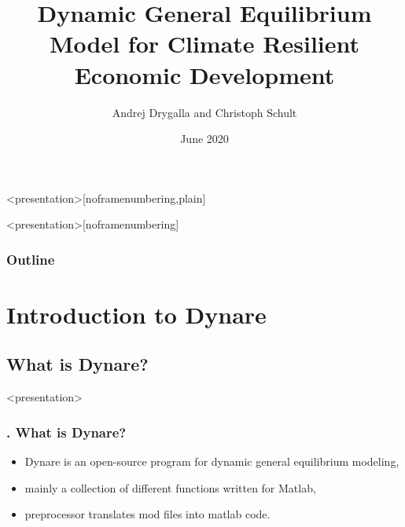 \documentclass[11pt,aspectratio=169]{beamer}
\title[DGE-CRED]{Dynamic General Equilibrium Model for Climate Resilient Economic Development}
\author[Christoph Schult]{Andrej Drygalla and Christoph Schult} \date[June 2020]{June 2020}
\institute[IWH]{Halle Institute for Economic Research}
\begin{document}
{}

\begin{frame}<presentation>[noframenumbering,plain]
  \titlepage
\end{frame}
\usebackgroundtemplate{
}
\begin{frame}<presentation>[noframenumbering]
	\frametitle{Outline}
		 \tableofcontents[hideallsubsections]
\end{frame}

\section{Introduction to Dynare}

\subsection{What is Dynare?}
\begin{frame}<presentation>
\frametitle{{\thesection.\thesubsection} What is Dynare?}
  \begin{itemize}
		\item Dynare is an open-source program for dynamic general equilibrium modeling,
		\item mainly a collection of different functions written for Matlab,
		\item preprocessor translates mod files into matlab code.
	\end{itemize}
\end{frame}
\end{document}
